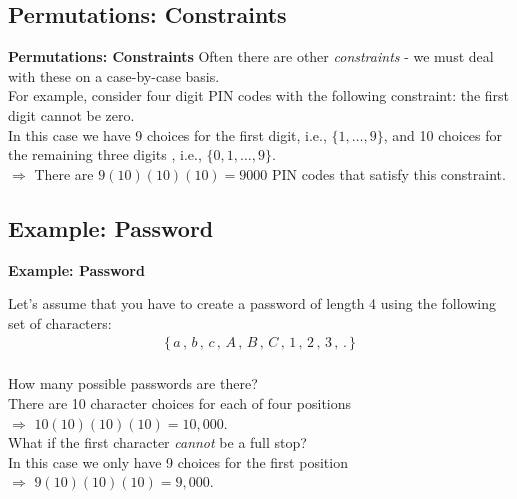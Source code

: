 \documentclass[compress]{beamer}        %
\makeatletter
\newcommand{\tcb}{\textcolor{beamer@blendedblue}}
\makeatother
\begin{document}
\subsection{Permutations: Constraints}
\begin{frame}{\bf \tcb{Permutations: Constraints}}
Often there are other \emph{constraints} - we must deal with these on a case-by-case basis.\\[0.8cm]

For example, consider four digit PIN codes with the following constraint: the first digit cannot be zero.\\[0.8cm]

In this case we have 9 choices for the first digit, i.e., $\{1,\ldots,9\}$, and 10 choices for the remaining three digits , i.e., $\{0,1,\ldots,9\}$.\\[0.4cm]

$\Rightarrow$ There are $9(10)(10)(10) = 9000$ PIN codes that satisfy this constraint.


\end{frame}



\subsection{Example: Password}
\begin{frame}{\bf \tcb{Example: Password}}

Let's assume that you have to create a password of length 4 using the following set of characters:
\begin{align*}
\{\,a\,,\,b\,,\,c\,,\,A\,,\,B\,,\,C\,,\,1\,,\,2\,,\,3\,,\,.\,\}\\
\end{align*}

How many possible passwords are there?\\[0.2cm]

There are 10 character choices for each of four positions \\$\Rightarrow$ $10(10)(10)(10) = 10,\!000$.\\[0.5cm]

What if the first character \emph{cannot} be a full stop?\\[0.2cm]

In this case we only have 9 choices for the first position \\$\Rightarrow$ $9(10)(10)(10) = 9,\!000$.

\end{frame}
\end{document}
